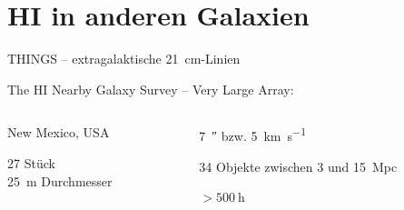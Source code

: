 \section{HI in anderen Galaxien}
\begin{frame}[plain,t]{THINGS – extragalaktische \SI{21}{\centi\meter}-Linien}

  The H\textsc{I} Nearby Galaxy Survey – Very Large Array: 

  \begin{columns}[c, onlytextwidth]
    \begin{column}{0.4\textwidth}
      \begin{description}[Teleskope]
        \item[Ort] New Mexico, USA
        \item[Teleskope] 27 Stück \\
          \SI{25}{\meter} Durchmesser
      \end{description}
    \end{column}
    \begin{column}{0.55\textwidth}
      \begin{description}[Messdauer]
        \item[Auflösung] \SI{7}{\arcsecond} bzw. \SI{5}{\kilo\meter\per\second}
        \item[Messung] 34 Objekte zwischen  \num{3} und \SI{15}{\mega pc}
        \item[Messdauer] $> \SI{500}{\hour}$
      \end{description}
    \end{column}
  \end{columns}
  
  
\end{frame}


